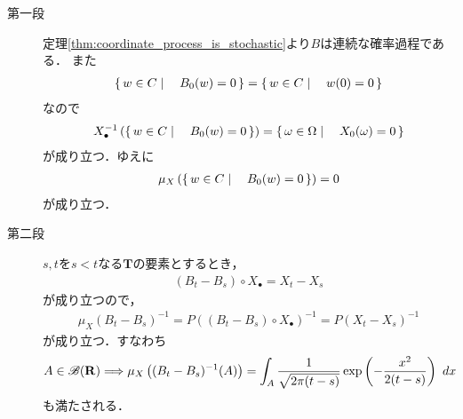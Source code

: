 	\begin{sketch}\mbox{}
		\begin{description}
			\item[第一段]
				定理\ref{thm:coordinate_process_is_stochastic}より$B$は連続な確率過程である．
				また
				\begin{align}
					\left\{\, w \in C \mid \quad B_0(w)=0\, \right\} = \left\{\, w \in C \mid \quad w(0) = 0\, \right\}
				\end{align}
				なので
				\begin{align}
					X_\bullet^{-1}\left(\left\{\, w \in C \mid \quad B_0(w)=0\, \right\}\right)
					= \left\{\, \omega \in \Omega \mid \quad X_0(\omega) = 0\, \right\}
				\end{align}
				が成り立つ．ゆえに
				\begin{align}
					\mu_X\left(\left\{\, w \in C \mid \quad B_0(w)=0\, \right\}\right) = 0
				\end{align}
				が成り立つ．
				
			\item[第二段]
				$s,t$を$s < t$なる$\mathbf{T}$の要素とするとき，
				\begin{align}
					(B_t - B_s) \circ X_\bullet = X_t - X_s
				\end{align}
				が成り立つので，
				\begin{align}
					\mu_X (B_t - B_s)^{-1}
					= P \left((B_t - B_s) \circ X_\bullet\right)^{-1}
					= P (X_t - X_s)^{-1}
				\end{align}
				が成り立つ．すなわち
				\begin{align}
					A \in \mathscr{B}(\mathbf{R}) \Longrightarrow
					\mu_X\left((B_t-B_s)^{-1}(A)\right)
					= \int_A \frac{1}{\sqrt{2\pi(t-s)}} \exp\left(-\frac{x^2}{2(t-s)}\right)\ dx
				\end{align}
				も満たされる．
			

\end{description}
\end{sketch}
